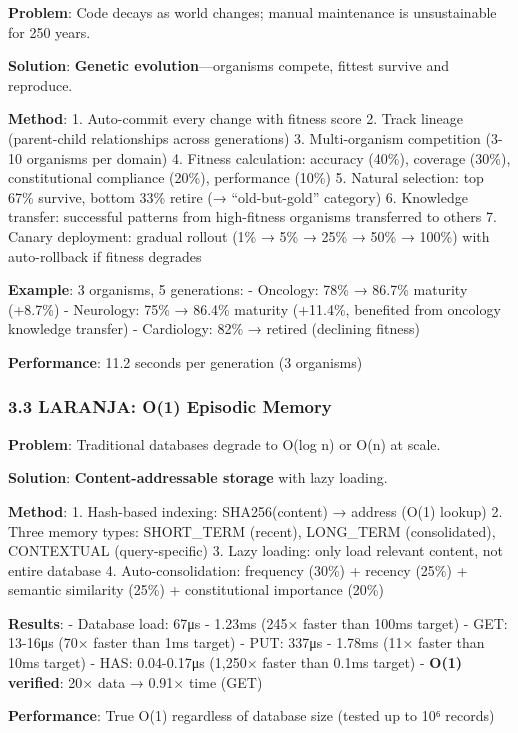 \documentclass[
]{article}
\begin{document}
\textbf{Problem}: Code decays as world changes; manual maintenance is
unsustainable for 250 years.

\textbf{Solution}: \textbf{Genetic evolution}---organisms compete,
fittest survive and reproduce.

\textbf{Method}: 1. Auto-commit every change with fitness score 2. Track
lineage (parent-child relationships across generations) 3.
Multi-organism competition (3-10 organisms per domain) 4. Fitness
calculation: accuracy (40\%), coverage (30\%), constitutional compliance
(20\%), performance (10\%) 5. Natural selection: top 67\% survive,
bottom 33\% retire (→ ``old-but-gold'' category) 6. Knowledge transfer:
successful patterns from high-fitness organisms transferred to others 7.
Canary deployment: gradual rollout (1\% → 5\% → 25\% → 50\% → 100\%)
with auto-rollback if fitness degrades

\textbf{Example}: 3 organisms, 5 generations: - Oncology: 78\% → 86.7\%
maturity (+8.7\%) - Neurology: 75\% → 86.4\% maturity (+11.4\%,
benefited from oncology knowledge transfer) - Cardiology: 82\% → retired
(declining fitness)

\textbf{Performance}: 11.2 seconds per generation (3 organisms)

\subsubsection{3.3 LARANJA: O(1) Episodic
Memory}\label{laranja-o1-episodic-memory}

\textbf{Problem}: Traditional databases degrade to O(log n) or O(n) at
scale.

\textbf{Solution}: \textbf{Content-addressable storage} with lazy
loading.

\textbf{Method}: 1. Hash-based indexing: SHA256(content) → address (O(1)
lookup) 2. Three memory types: SHORT\_TERM (recent), LONG\_TERM
(consolidated), CONTEXTUAL (query-specific) 3. Lazy loading: only load
relevant content, not entire database 4. Auto-consolidation: frequency
(30\%) + recency (25\%) + semantic similarity (25\%) + constitutional
importance (20\%)

\textbf{Results}: - Database load: 67μs - 1.23ms (245× faster than 100ms
target) - GET: 13-16μs (70× faster than 1ms target) - PUT: 337μs -
1.78ms (11× faster than 10ms target) - HAS: 0.04-0.17μs (1,250× faster
than 0.1ms target) - \textbf{O(1) verified}: 20× data → 0.91× time (GET)

\textbf{Performance}: True O(1) regardless of database size (tested up
to 10⁶ records)
\end{document}
